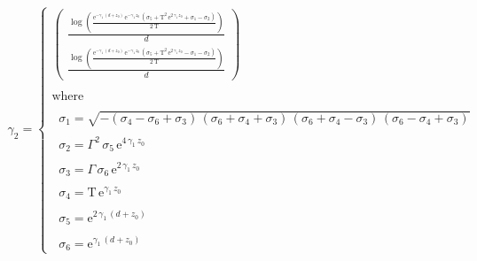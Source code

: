 \documentclass{article}
\begin{document}
\begin{align*}
    \gamma_2 = \left\{\begin{array}{l}
        \left(\begin{array}{c}
        \frac{\log \left(\frac{{\mathrm{e}}^{-\gamma_1 \,{\left(d+z_0 \right)}} \,{\mathrm{e}}^{-\gamma_1 \,z_0 } \,{\left(\sigma_5 +{\mathrm{T}}^2 \,{\mathrm{e}}^{2\,\gamma_1 \,z_0 } +\sigma_1 -\sigma_2 \right)}}{2\,\mathrm{T}}\right)}{d}\\
        \frac{\log \left(\frac{{\mathrm{e}}^{-\gamma_1 \,{\left(d+z_0 \right)}} \,{\mathrm{e}}^{-\gamma_1 \,z_0 } \,{\left(\sigma_5 +{\mathrm{T}}^2 \,{\mathrm{e}}^{2\,\gamma_1 \,z_0 } -\sigma_1 -\sigma_2 \right)}}{2\,\mathrm{T}}\right)}{d}
        \end{array}\right)\\
        \mathrm{}\\
        \textrm{where}\\
        \mathrm{}\\
        \;\;\sigma_1 =\sqrt{-{\left(\sigma_4 -\sigma_6 +\sigma_3 \right)}\,{\left(\sigma_6 +\sigma_4 +\sigma_3 \right)}\,{\left(\sigma_6 +\sigma_4 -\sigma_3 \right)}\,{\left(\sigma_6 -\sigma_4 +\sigma_3 \right)}}\\
        \mathrm{}\\
        \;\;\sigma_2 =\Gamma^2 \,\sigma_5 \,{\mathrm{e}}^{4\,\gamma_1 \,z_0 } \\
        \mathrm{}\\
        \;\;\sigma_3 =\Gamma \,\sigma_6 \,{\mathrm{e}}^{2\,\gamma_1 \,z_0 } \\
        \mathrm{}\\
        \;\;\sigma_4 =\mathrm{T}\,{\mathrm{e}}^{\gamma_1 \,z_0 } \\
        \mathrm{}\\
        \;\;\sigma_5 ={\mathrm{e}}^{2\,\gamma_1 \,{\left(d+z_0 \right)}} \\
        \mathrm{}\\
        \;\;\sigma_6 ={\mathrm{e}}^{\gamma_1 \,{\left(d+z_0 \right)}} 
        \end{array}\right.
\end{align*}
\end{document}
